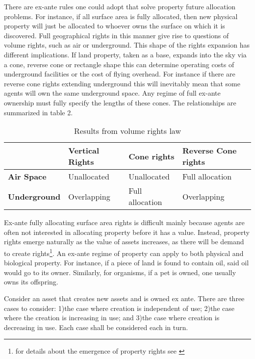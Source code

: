 There are ex-ante rules one could adopt that solve property future allocation problems. For instance, if all surface area is fully allocated, then new physical property will just be allocated to whoever owns the surface on which it is discovered. Full geographical rights in this manner give rise to questions of volume rights, such as air or underground. This shape of the rights expansion has different implications. If land property, taken as a base, expands into the sky via a cone, reverse cone or rectangle shape this can determine operating costs of underground facilities or the cost of flying overhead. For instance if there are reverse cone rights extending underground this will inevitably mean that some agents will own the same underground space. Any regime of full ex-ante ownership must fully specify the lengths of these cones. The relationships are summarized in table 2.

\begin{table}[h]
\begin{tabular}{|l|l|l|l|}
\hline
                     & \textbf{Vertical Rights}       & \textbf{Cone rights}          & \textbf{Reverse Cone rights}  \\ \hline
\textbf{Air Space}   & Unallocated             & Unallocated            & Full allocation \\ \hline
\textbf{Underground} & Overlapping & Full allocation & Overlapping       \\ \hline
\end{tabular}
\caption{Results from volume rights law}
\label{Volume}
\end{table}

Ex-ante fully allocating surface area rights is difficult mainly because agents are often not interested in allocating property before it has a value. Instead, property rights emerge naturally as the value of assets increases, as there will be demand to create rights\footnote{for details about the emergence of property rights see \cite{Alchian1973}}. An ex-ante regime of property can apply to both physical and biological property. For instance, if a piece of land is found to contain oil, said oil would go to its owner. Similarly, for organisms, if a pet is owned, one usually owns its offspring.

Consider an asset that creates new assets and is owned ex ante. There are three cases to consider: 1)the case where creation is independent of use; 2)the case where the creation is increasing in use; and 3)the case where creation is decreasing in use. Each case shall be considered each in turn. 

